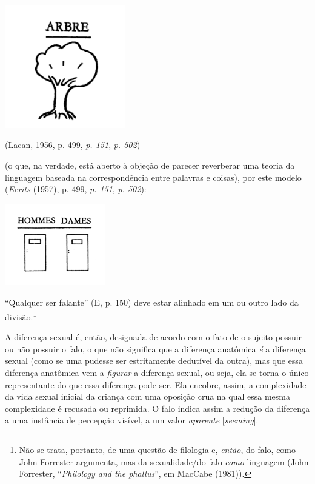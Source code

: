 \begin{center}
\includegraphics[width=2.06597in,height=2.11319in]{./img1.jpg}

(Lacan, 1956, p. 499, \emph{p. 151}, \emph{p. 502})
\end{center}

\noindent{}(o que, na verdade, está aberto à objeção de parecer reverberar uma
teoria da linguagem baseada na correspondência entre palavras e coisas),
por este modelo (\emph{Ecrits} (1957), p. 499, \emph{p. 151}, \emph{p.
502}):

\begin{center}
\includegraphics[width=1.72639in,height=1.40556in]{./img2.jpg}
\end{center}

``Qualquer ser falante'' (E, p. 150) deve estar alinhado em um ou outro
lado da divisão.\footnote{Não se trata, portanto, de uma questão de
  filologia e, \emph{então}, do falo, como John Forrester argumenta, mas
  da sexualidade/do falo \emph{como} linguagem (John Forrester,
  ``\emph{Philology and the phallus}'', em MacCabe (1981)).}

A diferença sexual é, então, designada de acordo com o fato de o sujeito
possuir ou não possuir o falo, o que não significa que a diferença
anatômica \emph{é} a diferença sexual (como se uma pudesse ser
estritamente dedutível da outra), mas que essa diferença anatômica vem a
\emph{figurar} a diferença sexual, ou seja, ela se torna o único
representante do que essa diferença pode ser. Ela encobre, assim, a
complexidade da vida sexual inicial da criança com uma oposição crua na
qual essa mesma complexidade é recusada ou reprimida. O falo indica
assim a redução da diferença a uma instância de percepção visível, a um
valor \emph{aparente} {[}\emph{seeming}{]}.

